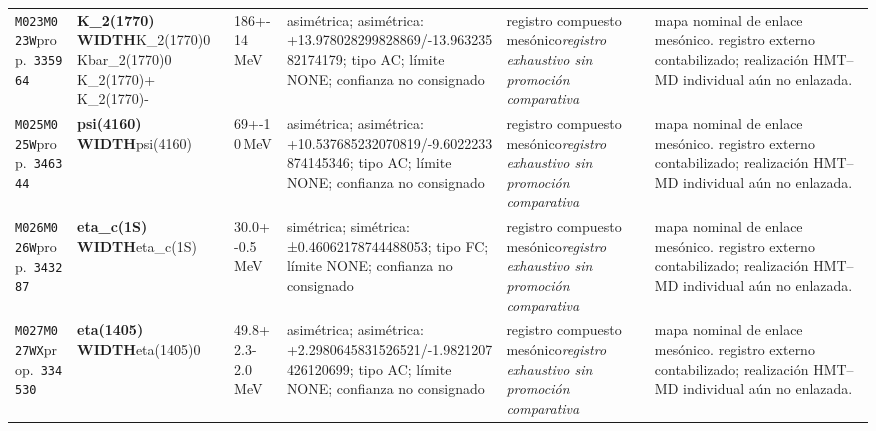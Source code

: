 \begin{landscape}
\begin{longtable}{L{1.85cm}L{4.45cm}L{2.35cm}L{4.05cm}L{3.35cm}L{7.15cm}}
\texttt{M023}\newline \texttt{M023W}\newline prop.\ \texttt{335964} & \textbf{K\_\allowbreak{}2(1770) WIDTH}\newline K\_\allowbreak{}2(1770)0 \textbar{}\allowbreak{} Kbar\_\allowbreak{}2(1770)0 \textbar{}\allowbreak{} K\_\allowbreak{}2(1770)+ \textbar{}\allowbreak{} K\_\allowbreak{}2(1770)- & 186+-14\,MeV & asimétrica; asimétrica: +13.978028299828869/-13.96323582174179; tipo AC; límite NONE; confianza no consignado & registro compuesto mesónico\newline \emph{registro exhaustivo sin promoción comparativa} & mapa nominal de enlace mesónico. registro externo contabilizado; realización HMT--MD individual aún no enlazada. \\
\texttt{M025}\newline \texttt{M025W}\newline prop.\ \texttt{346344} & \textbf{psi(4160) WIDTH}\newline psi(4160) & 69+-10\,MeV & asimétrica; asimétrica: +10.537685232070819/-9.6022233874145346; tipo AC; límite NONE; confianza no consignado & registro compuesto mesónico\newline \emph{registro exhaustivo sin promoción comparativa} & mapa nominal de enlace mesónico. registro externo contabilizado; realización HMT--MD individual aún no enlazada. \\
\texttt{M026}\newline \texttt{M026W}\newline prop.\ \texttt{343287} & \textbf{eta\_\allowbreak{}c(1S) WIDTH}\newline eta\_\allowbreak{}c(1S) & 30.0+-0.5\,MeV & simétrica; simétrica: ±0.46062178744488053; tipo FC; límite NONE; confianza no consignado & registro compuesto mesónico\newline \emph{registro exhaustivo sin promoción comparativa} & mapa nominal de enlace mesónico. registro externo contabilizado; realización HMT--MD individual aún no enlazada. \\
\texttt{M027}\newline \texttt{M027WX}\newline prop.\ \texttt{334530} & \textbf{eta(1405) WIDTH}\newline eta(1405)0 & 49.8+2.3-2.0\,MeV & asimétrica; asimétrica: +2.2980645831526521/-1.9821207426120699; tipo AC; límite NONE; confianza no consignado & registro compuesto mesónico\newline \emph{registro exhaustivo sin promoción comparativa} & mapa nominal de enlace mesónico. registro externo contabilizado; realización HMT--MD individual aún no enlazada. \\

\end{longtable}
\end{landscape}
